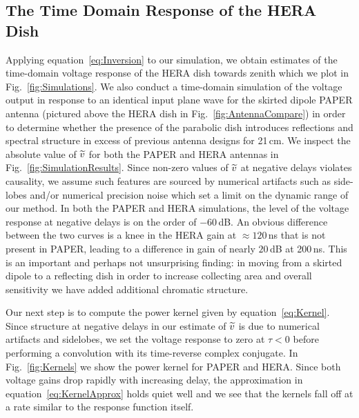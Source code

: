 \documentclass[twocolumn]{emulateapj}
\begin{document}
\subsection{The Time Domain Response of the HERA Dish}\label{ssec:Kernel}
Applying equation~\ref{eq:Inversion} to our simulation, we obtain estimates of the time-domain voltage response of the HERA dish towards zenith which we plot in Fig.~\ref{fig:Simulations}. We also conduct a time-domain simulation of the voltage output in response to an identical input plane wave for the skirted dipole PAPER antenna (pictured above the HERA dish in Fig.~\ref{fig:AntennaCompare}) in order to determine whether the presence of the parabolic dish introduces reflections and spectral structure in excess of previous antenna designs for 21\,cm.  We inspect the absolute value of ${\widetilde{v}}$ for both the PAPER and HERA antennas in Fig.~\ref{fig:SimulationResults}. Since non-zero values of ${\widetilde{v}}$ at negative delays violates causality, we assume such features are sourced by numerical artifacts such as side-lobes and/or numerical precision noise which set a limit on the dynamic range of our method. In both the PAPER and HERA simulations, the level of the voltage response at negative delays is on the order of $-60$\,dB. An obvious difference between the two curves is a knee in the HERA gain at $\approx 120$\,ns that is not present in PAPER, leading to a difference in gain of nearly $20$\,dB at 200\,ns. This is an important and perhaps not unsurprising finding: in moving from a skirted dipole to a reflecting dish in order to increase collecting area and overall sensitivity we have added additional chromatic structure. 

Our next step is to compute the power kernel given by      equation~\ref{eq:Kernel}. Since structure at negative delays in our estimate of ${\widetilde{v}}$ is due to numerical artifacts and sidelobes, we set the voltage response to zero at $\tau<0$ before performing a convolution with its time-reverse complex conjugate. In Fig.~\ref{fig:Kernels} we show the power kernel for PAPER and HERA. Since both voltage gains drop rapidly with increasing delay, the approximation in equation~\ref{eq:KernelApprox} holds quiet well and we see that the kernels fall off at a rate similar to the response function itself. 
\end{document}
